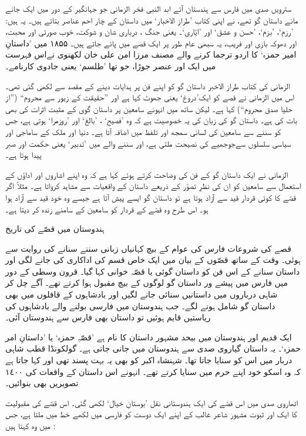 \documentclass[a4paper]{article}
\newcommand{\subtitle}[1]{\begingroup\fontsize{24pt}{12pt}\titlefont #1\endgroup\nopagebreak}
\begin{document}
سترویں صدی میں فارس سے ہندستان آئے ابد النبی فخر الزمانی جو جہانگیر کے دور میں ایک جانے مانے داستان گو تھے، نے اپنی کتاب ’طراز الاخبار‘ میں داستان کے چار احم عناصر بتائے ہیں۔ یہ ہیں: ’رزم‘، ’بزم‘، ’حسن و عشق‘ اور ’ایّاری‘۔ یعنی جنگ ،  درباری شان و شوکت، خوب صورتی اور محبت، اور  دھوکہ بازی اور فریب، یہ سبھی عام طور پر ایک قصے میں پائے جاتے ہیں۔ ۱۸۵۵ میں ’داستانِ امیر حمزہ‘ کا اردو ترجما کرنے والے مصنف مرزا امن علی خان لکھنوی نےاس فہرست میں ایک اور عنصر جوڑا، جو تھا ’طلسم‘ یعنی جادوی کارنامے۔

الزمانی کی کتاب طراز الاخبر داستان گو کو اپنے فن پر ہدایات دینے کے مقصد سے لکھی گئی تھی۔ اس میں الزمانی نے قصے کو ایک’دروغ‘ یعنی جھوٹ کہا ہے اور ”حقیقت کے زیور سے محروم“ (”از حلیا صدق محروم“) کہا ہے۔  لیکن ساتھ میں انہونے سامعین پر داستان گوی  کے مثبت اثرات کی بھی بات کی ہے۔  داستان گو کی زبان کی یہ خصوصیت ہے کہ وہ ’فصیح‘ ، ’بالغ‘ اور ’روزمرا‘ ہوتی ہے، جس کو سننے سے سامعین کی لسانی سمجھ اور تلفظ میں اضافہ آتا ہے۔ دنیا اور ملک کے ساماجی اور سیاسی سلسلوں  سےجوجھیے کی نصیحت ملتی ہے، اور سننے والے میں ’تدبیر‘ یعنی حکمت اور صبر پیدا ہوتا ہے۔

الزمانی نے ایک داستان گو کے فن کی  وضاحت  کرتے ہوئے کہا ہے کہ وہ اپنے اشاروں اور اداؤں کے استعمال سے سامعین کو ان کی نظرِ تصوّر کے ذریعے داستان کے واقعیات سے مشاہد کرواتا ہے۔ مثلاً اگر قصّے کا کوئی قردار قید سے آزاد ہوتا ہے تو داستان گو ایسے پیش آتا ہے  جیسے وہ خود قید سے آزاد ہوا ہو۔ اس طرح وہ قصّے کے قردار  کو سامعین کے سامنے زندہ کر دیتا ہے۔ 

\subtitle{ہندوستان میں قصّے کی تاریخ}

قصے کی شروعات فارس کی عوام کے بیچ کہانیاں زبانی سننے سنانے کی روایت سے ہوئی۔ وقت کے ساتھ قصّوں کے بیان  میں ایک خاص قسم کی اداکاری کی جانے لگی اور داستان سنانے کے اس فن کو داستان گوئی یا قصّہ خوانی  کہا  گیا۔ قرون وسطی کے دور میں فارس میں پیشے ور داستان گو لوگوں کے بیچ مقبول ہوا کرتے تھے۔ آگے چل کر شاہی درباروں میں داستانیں سنائی جانے لگیں اور بادشاہوں کے قافلوں میں بھی داستان گو شامل ہونے لگے۔ جب ہندوستان میں فارسی بولنے والے بادشاہوں کی ریاستیں قایم ہوئیں تو داستان بھی فارس سے ہندوستان آئی۔

ایک قدیم اور ہندوستان میں بیحد مشہور داستان کا نام ہے ’قصّہِ حمزہ‘ یا ’داستانِ امر حمزہ‘۔ یہ داستان گیاروی صدی سے ہندوستان میں جانی جاتی ہے۔ گولکونڈا قطب شاہی دربار میں اس کو سنایا جاتا تھا۔ شہنشاہ اکبر کو بھی یہ بہت پسند تھی اور کہا جاتا ہے کہ وہ اسکو خود اپنے حرم میں سنایا کرتے تھے۔ انہونے اس داستان کے واقعات کی ١٤٠٠ تصویریں بھی بنوائیں۔

 اٹھاروی صدی میں اس قصّے کی ایک ہندوستانی نقل ’بوستانِ خیال‘  لکھی گئی۔ اس قصّے کی مقبولیت کا ایک اور ثبوت مشہور شاعر غالب کے اپنے ایک دوست کو فارسی میں لکھے خط میں ملتا ہے، جس میں وہ کہتا ہیں :
\end{document}
